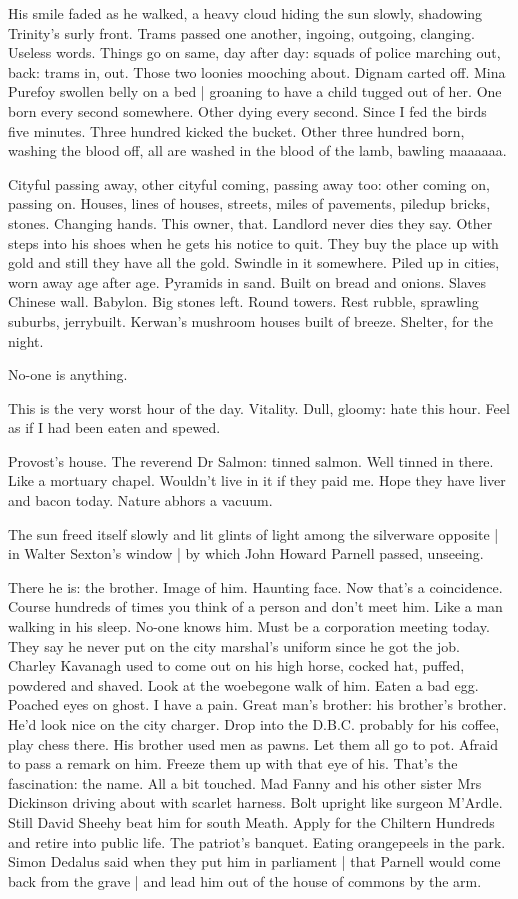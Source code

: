 His smile faded as he walked,
a heavy cloud hiding the sun slowly,
shadowing Trinity's surly front.
Trams passed one another,
ingoing,
outgoing,
clanging.
Useless words.
Things go on same,
day after day:
squads of police marching out,
back:
trams in,
out.
Those two loonies mooching about.
Dignam carted off.
Mina Purefoy swollen belly on a bed |
groaning to have a child tugged out of her.
One born every second somewhere.
Other dying every second.
Since I fed the birds five minutes.
Three hundred kicked the bucket.
Other three hundred born,
washing the blood off,
all are washed in the blood of the lamb,
bawling maaaaaa.

Cityful passing away,
other cityful coming,
passing away too:
other coming on,
passing on.
Houses, lines of houses,
streets,
miles of pavements,
piledup bricks,
stones.
Changing hands.
This owner,
that.
Landlord never dies they say.
Other steps into his shoes when he gets his notice to quit.
They buy the place up with gold and still they have all the gold.
Swindle in it somewhere.
Piled up in cities,
worn away age after age.
Pyramids in sand.
Built on bread and onions.
Slaves Chinese wall.
Babylon.
Big stones left.
Round towers.
Rest rubble,
sprawling suburbs,
jerrybuilt.
Kerwan's mushroom houses built of breeze.
Shelter,
for the night.

No-one is anything.

This is the very worst hour of the day.
Vitality.
Dull, gloomy:
hate this hour.
Feel as if I had been eaten and spewed.

Provost's house.
The reverend Dr Salmon:
tinned salmon.
Well tinned in there.
Like a mortuary chapel.
Wouldn't live in it if they paid me.
Hope they have liver and bacon today.
Nature abhors a vacuum.

The sun freed itself slowly
and lit glints of light among the silverware opposite |
in Walter Sexton's window |
by which John Howard Parnell passed,
unseeing.

There he is:
the brother.
Image of him.
Haunting face.
Now that's a coincidence.
Course hundreds of times you think of a person and don't meet him.
Like a man walking in his sleep.
No-one knows him.
Must be a corporation meeting today.
They say he never put on the city marshal's uniform since he got the job.
Charley Kavanagh used to come out on his high horse,
cocked hat,
puffed, powdered and shaved.
Look at the woebegone walk of him.
Eaten a bad egg.
Poached eyes on ghost.
I have a pain.
Great man's brother:
his brother's brother.
He'd look nice on the city charger.
Drop into the D.B.C.
probably for his coffee,
play chess there.
His brother used men as pawns.
Let them all go to pot.
Afraid to pass a remark on him.
Freeze them up with that eye of his.
That's the fascination:
the name.
All a bit touched.
Mad Fanny and his other sister Mrs Dickinson driving about with scarlet harness.
Bolt upright like surgeon M'Ardle.
Still David Sheehy beat him for south Meath.
Apply for the Chiltern Hundreds and retire into public life.
The patriot's banquet.
Eating orangepeels in the park.
Simon Dedalus said when they put him in parliament |
that Parnell would come back from the grave |
and lead him out of the house of commons by the arm.

